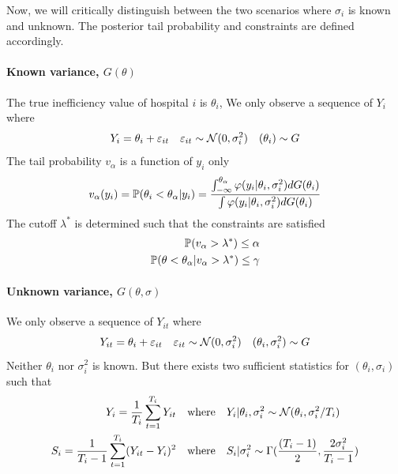 \documentclass[12pt]{article}
\begin{document}
Now, we will critically distinguish between the two scenarios where
\(\sigma_i\) is known and unknown. The posterior tail probability and
constraints are defined accordingly.

\paragraph{Known variance, $G(\theta)$}
The true inefficiency value of hospital $i$ is $\theta_i$, We only observe a
sequence of $Y_{i}$ where
\begin{equation*}
    Y_{i} = \theta_i + \varepsilon_{it} \quad \varepsilon_{it} \sim \mathcal{N}(0,\sigma_i^2) \quad (\theta_i) \sim G
\end{equation*}
The tail probability $v_\alpha$ is a function of $y_i$ only
\begin{equation*}
    v_\alpha(y_i) =\mathbb{P}(\theta_i<\theta_\alpha|y_i) =\frac{\int_{-\infty}^{\theta_\alpha} \varphi(y_i|\theta_i,\sigma_i^2)dG(\theta_i)}{\int \varphi(y_i|\theta_i,\sigma_i^2)dG(\theta_i)}
\end{equation*}
The cutoff $\lambda^*$ is determined such that the constraints are satisfied
\begin{align*}
    \mathbb{P}(v_\alpha>\lambda^*) \le \alpha \\
    \mathbb{P}(\theta<\theta_\alpha|v_\alpha>\lambda^*) \le \gamma
\end{align*}

\paragraph{Unknown variance, $G(\theta,\sigma)$}
We only observe a sequence of $Y_{it}$ where
\begin{equation*}
    Y_{it} = \theta_i + \varepsilon_{it} \quad \varepsilon_{it} \sim \mathcal{N}(0,\sigma_i^2) \quad (\theta_i,\sigma_i^2) \sim G
\end{equation*}
Neither $\theta_i$ nor $\sigma_i^2$ is known. But there exists two sufficient statistics for $(\theta_i,\sigma_i)$ such that
\begin{align*}
    Y_i=\frac{1}{T_i}\sum_{t=1}^{T_i}Y_{it}           & \quad \text{where}\quad Y_i|\theta_i,\sigma_i^2 \sim \mathcal{N}(\theta_i,\sigma_i^2/T_i)              \\
    S_i=\frac{1}{T_i-1}\sum_{t=1}^{T_i}(Y_{it}-Y_i)^2 & \quad \text{where} \quad S_i|\sigma_i^2 \sim \Gamma(\frac{(T_i-1)}{2},\frac{2\sigma_i^2}{T_i-1})
\end{align*}
\end{document}
